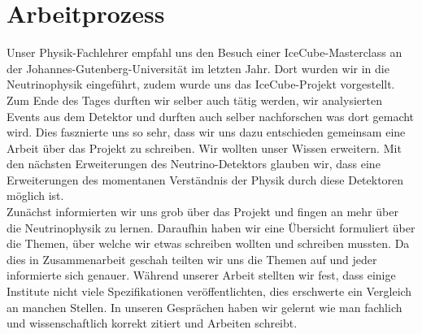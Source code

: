 \chapter*{Arbeitprozess} 

    \vspace{8pt}

    Unser Physik-Fachlehrer empfahl uns den Besuch einer IceCube-Masterclass 
    an der Johannes-Gutenberg-Universität im letzten Jahr. Dort wurden wir in
    die Neutrinophysik eingeführt, zudem wurde uns das IceCube-Projekt vorgestellt.
    Zum Ende des Tages durften wir selber auch tätig werden, wir analysierten Events aus
    dem Detektor und durften auch selber nachforschen was dort gemacht wird.
    Dies fasznierte uns so sehr, dass wir uns dazu entschieden gemeinsam eine Arbeit über das
    Projekt zu schreiben. Wir wollten unser Wissen erweitern. Mit den nächsten
    Erweiterungen des Neutrino-Detektors glauben wir, dass eine Erweiterungen des momentanen
    Verständnis der Physik durch diese Detektoren möglich ist. \\
    Zunächst informierten wir uns grob über das Projekt und fingen an mehr über die Neutrinophysik
    zu lernen. Daraufhin haben wir eine Übersicht formuliert über die Themen, über welche wir etwas
    schreiben wollten und schreiben mussten. Da dies in Zusammenarbeit geschah teilten wir uns
    die Themen auf und jeder informierte sich genauer. 
    Während unserer Arbeit stellten wir fest, dass einige Institute nicht viele Spezifikationen 
    veröffentlichten, dies erschwerte ein Vergleich an manchen Stellen. 
    In unseren Gesprächen haben wir gelernt wie man fachlich und wissenschaftlich korrekt zitiert und 
    Arbeiten schreibt. 

